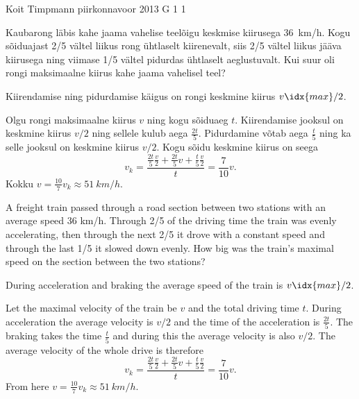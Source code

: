 {Koit Timpmann} %
{piirkonnavoor} %
{2013} %
{G 1} %
{1} %
{
\ifStatement
Kaubarong läbis kahe jaama vahelise teelõigu keskmise kiirusega \SI{36}{km/h}.
Kogu sõiduajast 2/5 vältel liikus rong ühtlaselt kiirenevalt, siis 2/5 vältel
liikus jääva kiirusega ning viimase 1/5 vältel pidurdas ühtlaselt aeglustuvalt.
Kui suur oli rongi maksimaalne kiirus kahe jaama vahelisel teel?
\fi


\ifHint
Kiirendamise ning pidurdamise käigus on rongi keskmine kiirus $v\idx{max}/2$.
\fi


\ifSolution
Olgu rongi maksimaalne kiirus $v$ ning kogu sõiduaeg $t$. Kiirendamise jooksul on keskmine kiirus $v/2$ ning sellele kulub aega $\frac{2t}{5}$. Pidurdamine võtab aega $\frac{t}{5}$ ning ka selle jooksul on keskmine kiirus $v/2$. Kogu sõidu keskmine kiirus on seega 
$$v_k = \frac{\frac{2t}{5} \frac{v}{2}+\frac{2t}{5} v + \frac{t}{5} \frac{v}{2}}{t} = \frac{7}{10} v.$$ 
Kokku $v=\frac{10}{7}v_k \approx \SI{51}{km/h}$.
\fi


\ifEngStatement
A freight train passed through a road section between two stations with an average speed 36 km/h. Through 2/5 of the driving time the train was evenly accelerating, then through the next 2/5 it drove with a constant speed and through the last 1/5 it slowed down evenly. How big was the train’s maximal speed on the section between the two stations?
\fi


\ifEngHint
During acceleration and braking the average speed of the train is $v\idx{max}/2$.
\fi


\ifEngSolution
Let the maximal velocity of the train be $v$ and the total driving time $t$. During acceleration the average velocity is $v/2$ and the time of the acceleration is $\frac{2t}{5}$. The braking takes the time $\frac{t}{5}$ and during this the average velocity is also $v/2$. The average velocity of the whole drive is therefore
$$v_k = \frac{\frac{2t}{5} \frac{v}{2}+\frac{2t}{5} v + \frac{t}{5} \frac{v}{2}}{t} = \frac{7}{10} v.$$
From here $v=\frac{10}{7}v_k \approx \SI{51}{km/h}$.
\fi
}